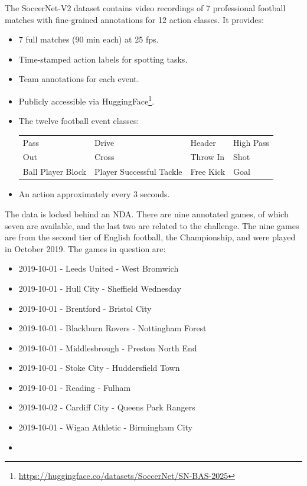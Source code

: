 The SoccerNet-V2 dataset \cite{deliege_soccernet-v2_dataset_2021} contains video recordings of 7 professional football matches with fine-grained annotations for 12 action classes. It provides:
\begin{itemize}
    \item 7 full matches (90 min each) at 25 fps.
    \item Time-stamped action labels for spotting tasks.
    \item Team annotations for each event.
    \item Publicly accessible via HuggingFace\footnote{\url{https://huggingface.co/datasets/SoccerNet/SN-BAS-2025}}.
    \item The twelve football event classes:
        \begin{center}
            \begin{tabular}{llll}
                Pass & Drive & Header & High Pass \\
                Out & Cross & Throw In & Shot \\
                Ball Player Block & Player Successful Tackle & Free Kick & Goal
            \end{tabular}
        \end{center}
    \item An action approximately every 3 seconds. 
\end{itemize}

The data is locked behind an NDA. There are nine annotated games, of which seven are available, and the last two are related to the challenge. The nine games are from the second tier of English football, the Championship, and were played in October 2019. The games in question are: 

\begin{itemize}
    \item 2019-10-01 - Leeds United - West Bromwich
    \item 2019-10-01 - Hull City - Sheffield Wednesday
    \item 2019-10-01 - Brentford - Bristol City
    \item 2019-10-01 - Blackburn Rovers - Nottingham Forest
    \item 2019-10-01 - Middlesbrough - Preston North End
    \item 2019-10-01 - Stoke City - Huddersfield Town
    \item 2019-10-01 - Reading - Fulham
    \item 2019-10-02 - Cardiff City - Queens Park Rangers
    \item 2019-10-01 - Wigan Athletic - Birmingham City
    \item 
\end{itemize}

